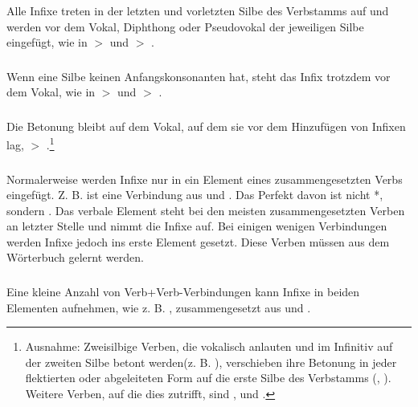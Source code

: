 \subsubsection{} Alle Infixe treten in der letzten und vorletzten Silbe des Verbstamms auf und werden vor dem Vokal, Diphthong oder Pseudovokal der jeweiligen Silbe eingefügt, wie in  $>$  und  $>$ .

\subsubsection{} Wenn eine Silbe keinen Anfangskonsonanten hat, steht das Infix trotzdem vor dem Vokal, wie in  $>$  und 
$>$ .

\subsubsection{} Die Betonung bleibt auf dem Vokal, auf dem sie vor dem Hinzufügen von Infixen lag,  $>$ .\footnote{Ausnahme: Zweisilbige Verben, die vokalisch anlauten und im Infinitiv auf der zweiten Silbe betont werden\linebreak (z. B. ), verschieben ihre Betonung in jeder flektierten oder abgeleiteten Form auf die erste Silbe des Verbstamms (, ). Weitere Verben, auf die dies zutrifft, sind ,  und . }

\subsubsection{} Normalerweise werden Infixe nur in ein Element eines zusammengesetzten Verbs eingefügt. Z. B. ist   eine Verbindung aus   und  . Das Perfekt davon ist nicht *, sondern . Das verbale Element steht bei den meisten zusammengesetzten Verben an letzter Stelle und nimmt die Infixe auf. Bei einigen wenigen Verbindungen werden Infixe jedoch ins erste Element gesetzt. Diese Verben müssen aus dem Wörterbuch gelernt werden. 

\subsubsection{} Eine kleine Anzahl von Verb+Verb-Verbindungen kann Infixe in beiden Elementen aufnehmen, wie z. B.  , zusammengesetzt aus   und  .

